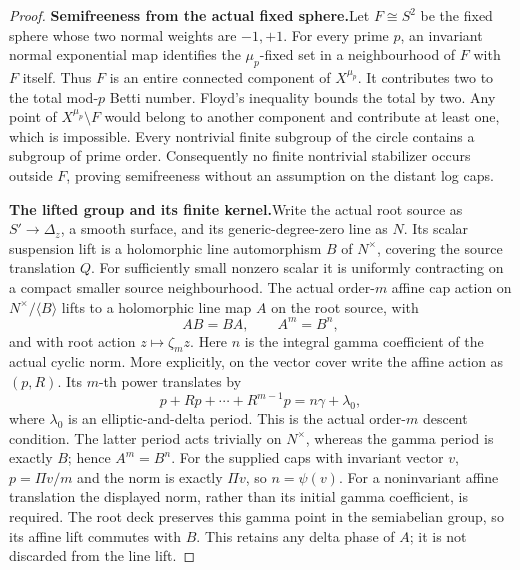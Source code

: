 \begin{proof}
\par\medskip\noindent\textbf{Semifreeness from the actual fixed sphere.}\enspace Let
\(F\cong S^2\) be the fixed sphere whose two normal weights
are \(-1,+1\).  For every prime \(p\), an invariant normal
exponential map identifies the \(\mu_p\)-fixed set in a
neighbourhood of \(F\) with \(F\) itself.  Thus \(F\)
is an entire connected component of \(X^{\mu_p}\).
It contributes two to the total mod-\(p\) Betti number.
Floyd's inequality \cite[Theorem 4.4]{Floyd1952} bounds the
total by two.  Any point of \(X^{\mu_p}\setminus F\)
would belong to another component and contribute at least one,
which is impossible.  Every nontrivial finite subgroup of the
circle contains a subgroup of prime order.  Consequently no
finite nontrivial stabilizer occurs outside \(F\), proving
semifreeness without an assumption on the distant log caps.

\par\medskip\noindent\textbf{The lifted group and its finite kernel.}\enspace Write the
actual root source as \(S'\to\Delta_z\), a smooth surface,
and its generic-degree-zero line as \(N\).  Its scalar
suspension lift is a holomorphic line automorphism \(B\) of
\(N^\times\), covering the source translation \(Q\).
For sufficiently small nonzero scalar it is uniformly contracting
on a compact smaller source neighbourhood.  The actual order-\(m\)
affine cap action on \(N^\times/\langle B\rangle\) lifts
to a holomorphic line map \(A\) on the root source, with
\[
 AB=BA,\qquad A^m=B^n,
\]
and with root action \(z\mapsto\zeta_m z\).  Here \(n\)
is the integral gamma coefficient of the actual cyclic norm.
More explicitly, on the vector cover write the affine action
as \((p,R)\).  Its \(m\)-th power translates by
\[
            p+Rp+\cdots+R^{m-1}p
                 =n\gamma+\lambda_0,
\]
where \(\lambda_0\) is an elliptic-and-delta period.  This
is the actual order-\(m\) descent condition.  The latter
period acts trivially on \(N^\times\), whereas the gamma
period is exactly \(B\); hence \(A^m=B^n\).
For the supplied caps with invariant vector \(v\),
\(p=\Pi v/m\) and the norm is exactly \(\Pi v\), so
\(n=\psi(v)\).  For a noninvariant affine translation the
displayed norm, rather than its initial gamma coefficient,
is required.  The root deck preserves this gamma point in
the semiabelian group, so its affine lift commutes with \(B\).
This retains any delta phase of \(A\); it is not discarded
from the line lift.


\end{proof}
